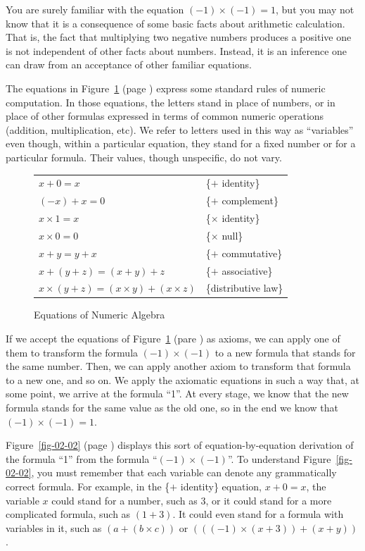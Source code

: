 You are surely familiar with the equation $(-1)\times(-1) = 1$, but you may
not know that it is a consequence of some basic facts about
arithmetic calculation. That is, the fact that multiplying two
negative numbers produces a positive one is not independent of
other facts about numbers. Instead, it is an inference one can draw
from an acceptance of other familiar equations.

The equations in Figure~\ref{fig-02-01} (page \pageref{fig-02-01})
express some standard rules of numeric computation. In those equations, the letters stand in
place of numbers, or in place of other
formulas expressed in terms of common numeric operations (addition,
multiplication, etc). We refer to letters used in this way as
``variables'' even though, within a particular equation, they
stand for a fixed number or for a particular formula.
Their values, though unspecific, do not vary.

\begin{figure}
\begin{center}
\begin{tabular}{ll}
$x+0 = x$                & \{$+$ identity\} \\
$(-x)+ x = 0$            & \{$+$ complement\} \\
$x \times 1 = x$         & \{$\times$ identity\} \\
$x \times 0 = 0$         & \{$\times$ null\} \\
$x+y = y+x$              & \{$+$ commutative\} \\
$x+(y+z) = (x+y)+z$      & \{$+$ associative\} \\
$x\times(y+z) = (x \times y)+(x \times z)$      & \{distributive law\} \\
\end{tabular}
\end{center}
\caption{Equations of Numeric Algebra}
\label{fig-02-01}
\end{figure}


If we accept the equations of Figure~\ref{fig-02-01} (pare \pageref{fig-02-01}) as axioms,
we can apply one of them to transform the formula $(-1)\times(-1)$ to a new formula that
stands for the same number. Then, we can apply another axiom to
transform that formula to a new one, and so on. We apply the
axiomatic equations in such a way that, at some point, we
arrive at the formula ``1''. At every stage, we know that the
new formula stands for the same value as the old one, so in
the end we know that $(-1)\times(-1) = 1$.

Figure~\ref{fig-02-02} (page \pageref{fig-02-02}) displays this sort of equation-by-equation derivation of the
formula ``1'' from the formula ``$(-1)\times(-1)$''. To
understand Figure~\ref{fig-02-02}, you must remember that each
variable can denote any
grammatically correct formula. For example, in the
\{$+$ identity\} equation, $x + 0 = x$, the variable $x$ could stand for
a number, such as 3, or it could stand for a more complicated
formula, such as $(1 + 3)$. It could even stand for a formula
with variables in it, such as $(a + (b \times c))$ or
$(((-1) \times (x + 3)) + (x + y))$.

